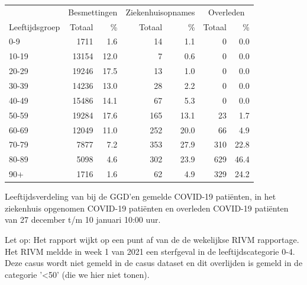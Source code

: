 \documentclass[
  english,
  man,floatsintext]{apa6}
\begin{document}
\begin{table}[H]
\centering\begingroup\fontsize{11}{13}\selectfont

\begin{threeparttable}
\begin{tabular}{lrrrrrr}
\toprule
\multicolumn{1}{c}{ } & \multicolumn{2}{c}{Besmettingen} & \multicolumn{2}{c}{Ziekenhuisopnames} & \multicolumn{2}{c}{Overleden} \\
\cmidrule(l{3pt}r{3pt}){2-3} \cmidrule(l{3pt}r{3pt}){4-5} \cmidrule(l{3pt}r{3pt}){6-7}
Leeftijdsgroep & Totaal & \% & Totaal & \% & Totaal & \%\\
\midrule
0-9 & 1711 & 1.6 & 14 & 1.1 & 0 & 0.0\\
10-19 & 13154 & 12.0 & 7 & 0.6 & 0 & 0.0\\
20-29 & 19246 & 17.5 & 13 & 1.0 & 0 & 0.0\\
30-39 & 14236 & 13.0 & 28 & 2.2 & 0 & 0.0\\
40-49 & 15486 & 14.1 & 67 & 5.3 & 0 & 0.0\\
50-59 & 19284 & 17.6 & 165 & 13.1 & 23 & 1.7\\
60-69 & 12049 & 11.0 & 252 & 20.0 & 66 & 4.9\\
70-79 & 7877 & 7.2 & 353 & 27.9 & 310 & 22.8\\
80-89 & 5098 & 4.6 & 302 & 23.9 & 629 & 46.4\\
90+ & 1716 & 1.6 & 62 & 4.9 & 329 & 24.2\\
\bottomrule
\end{tabular}
\begin{tablenotes}
\item[1] Leeftijdsverdeling van bij de GGD’en gemelde COVID-19 patiënten, in het ziekenhuis opgenomen COVID-19 patiënten en overleden COVID-19 patiënten van 27 december t/m 10 januari 10:00 uur.
\item[2] Let op: Het rapport wijkt op een punt af van de de wekelijkse RIVM rapportage. Het RIVM meldde in week 1 van 2021 een sterfgeval in de leeftijdscategorie 0-4. Deze casus wordt niet gemeld in de casus dataset en dit overlijden is gemeld in de categorie '<50' (die we hier niet tonen).
\end{tablenotes}
\end{threeparttable}
\endgroup{}
\end{table}

\newpage
\end{document}
